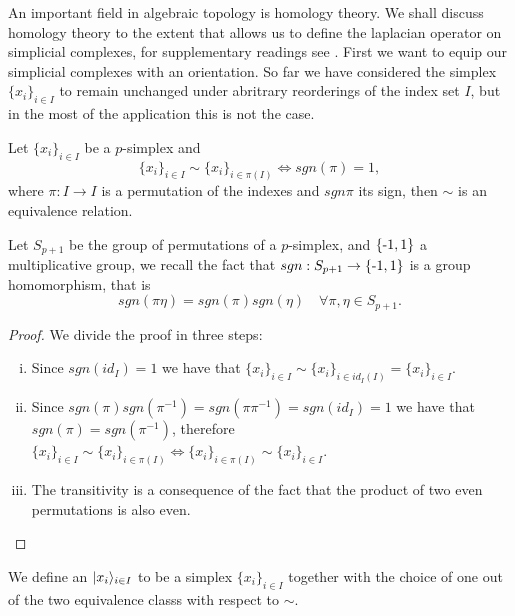 \documentclass[../1.tex]{subfiles}
\begin{document}
    An important field in algebraic topology is homology theory. We shall discuss homology theory to the extent
    that allows us to define the laplacian operator on simplicial complexes, for supplementary readings see \cite{singerthorpe,hatcher}.
    First we want to equip our simplicial complexes with an orientation. So far we have considered the simplex $\{x_i\}_{i \in I}$ to remain
    unchanged under abritrary reorderings of the index set $I$, but in the most of the application this is not the case.

    \begin{prop}
        Let $\{x_i\}_{i \in I}$ be a $p$-simplex and
        \[ \{x_i\}_{i \in I} \sim \{x_i\}_{i \in \pi(I)} \iff sgn(\pi) = 1,\]
        where $\pi : I \to I$ is a permutation of the indexes and $sgn\pi$ its sign, then $\sim$
        is an equivalence relation.
    \end{prop}
    \begin{rem}
        Let $S_{p+1}$ be the group of permutations of a $p$-simplex, and $\{\text{-}1,1\}$ a multiplicative group,
        we recall the fact that $sgn: S_{p+1} \to \{\text{-}1,1\}$ is a group homomorphism, that is \[sgn(\pi\eta) = sgn(\pi)sgn(\eta) \quad \forall \pi,\eta \in S_{p+1}.\]
    \end{rem}
    \begin{proof}
        We divide the proof in three steps:
        \begin{enumerate}[(i)]
            \item Since $sgn(id_I) = 1$ we have that $\{x_i\}_{i \in I} \sim \{x_i\}_{i \in id_I(I)} = \{x_i\}_{i \in I} $.
            \item Since $sgn(\pi)sgn(\pi^{-1}) = sgn(\pi\pi^{-1})=sgn(id_I)=1$ we have that $sgn(\pi) = sgn(\pi^{-1})$, therefore
                  $ \{x_i\}_{i \in I} \sim \{x_i\}_{i \in \pi(I)} \iff \{x_i\}_{i \in \pi(I)} \sim \{x_i\}_{i \in I}$.
            \item The transitivity is a consequence of the fact that the product of two even permutations is also even.\qedhere
        \end{enumerate}
    \end{proof}
  
    \begin{defn}
        We define an  $| x_i \rangle_{i \in I}$ to be a simplex $\{x_i\}_{i \in I}$ together with the choice of
        one out of the two equivalence classs with respect to $\sim$.
    \end{defn}
\end{document}
